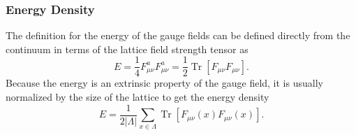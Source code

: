 \documentclass[a4paper,10pt]{article}
\begin{document}
\subsubsection{Energy Density}
The definition for the energy of the gauge fields can be defined directly from the continuum in terms of the lattice field strength tensor as
\begin{equation}
E=\frac{1}{4} F_{\mu \nu}^{a} F_{\mu \nu}^{a} = \frac{1}{2}\operatorname{Tr}\left[ F_{\mu \nu} F_{\mu \nu}\right].
\end{equation}
Because the energy is an extrinsic property of the gauge field, it is usually normalized by the size of the lattice to get the energy density
\begin{equation}
E = \frac{1}{2\left| \Lambda \right|}\sum\limits_{x\in\Lambda}\operatorname{Tr}\left[ F_{\mu \nu}(x) F_{\mu \nu}(x)\right].
\end{equation}
\end{document}
